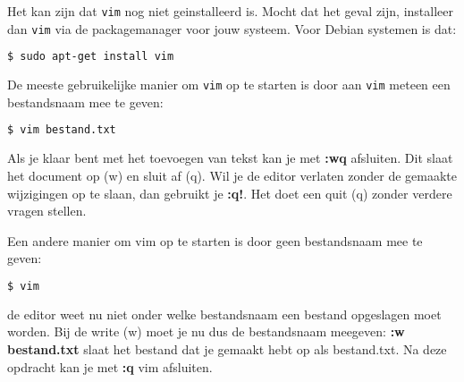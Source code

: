 Het kan zijn dat \texttt{vim} nog niet geinstalleerd is. Mocht dat het geval zijn, installeer dan \texttt{vim} via de packagemanager voor jouw systeem. Voor Debian systemen is dat:

\begin{lstlisting}[language=bash]
$ sudo apt-get install vim
\end{lstlisting}

De meeste gebruikelijke manier om \texttt{vim} op te starten is door aan \texttt{vim} meteen een bestandsnaam mee te geven:
\begin{lstlisting}[language=bash]
$ vim bestand.txt
\end{lstlisting}
Als je klaar bent met het toevoegen van tekst kan je met \textbf{:wq} afsluiten. Dit slaat het document op (w) en sluit af (q). Wil je de editor verlaten zonder de gemaakte wijzigingen op te slaan, dan gebruikt je \textbf{:q!}. Het doet een quit (q) zonder verdere vragen stellen.

Een andere manier om vim op te starten is door geen bestandsnaam mee te geven:
\begin{lstlisting}[language=bash]
$ vim
\end{lstlisting}
de editor weet nu niet onder welke bestandsnaam een bestand opgeslagen moet worden. Bij de write (w) moet je nu dus de bestandsnaam meegeven: \textbf{:w bestand.txt} slaat het bestand dat je gemaakt hebt op als bestand.txt. Na deze opdracht kan je met \textbf{:q} vim afsluiten.
